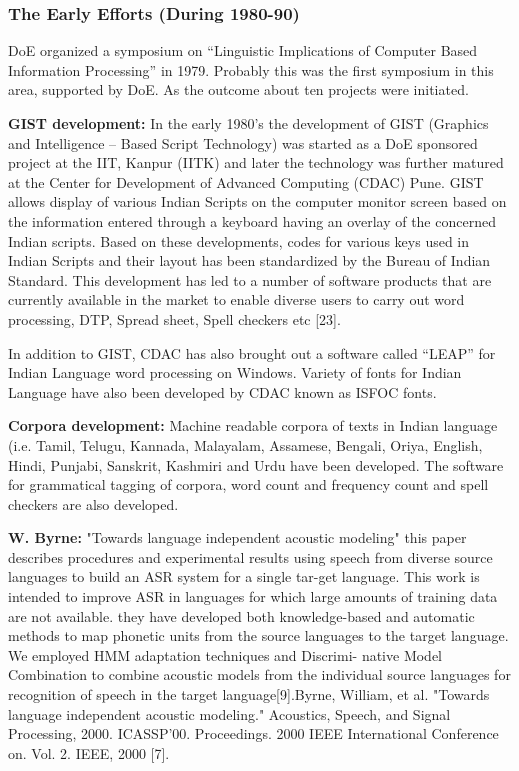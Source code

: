 \documentclass[12pt,a4paper,oneside]{memoir}
\begin{document}
\subsubsection{The Early Efforts (During 1980-90)}
DoE organized a symposium on “Linguistic Implications of Computer Based
Information Processing” in 1979. Probably this was the first symposium in this area,
supported by DoE. As the outcome about ten projects were initiated.

\textbf{GIST development:} In the early 1980’s the development of GIST (Graphics and
Intelligence – Based Script Technology) was started as a DoE sponsored project at the
IIT, Kanpur (IITK) and later the technology was further matured at the Center for
Development of Advanced Computing (CDAC) Pune. GIST allows display of various
Indian Scripts on the computer monitor screen based on the information entered
through a keyboard having an overlay of the concerned Indian scripts. Based on these
developments, codes for various keys used in Indian Scripts and their layout has been
standardized by the Bureau of Indian Standard. This development has led to a number
of software products that are currently available in the market to enable diverse users
to carry out word processing, DTP, Spread sheet, Spell checkers etc [23].

In addition to GIST, CDAC has also brought out a software called “LEAP” for Indian
Language word processing on Windows. Variety of fonts for Indian Language have
also been developed by CDAC known as ISFOC fonts.

\textbf{Corpora development:} Machine readable corpora of texts in Indian language
(i.e. Tamil, Telugu, Kannada, Malayalam, Assamese, Bengali, Oriya, English,
Hindi, Punjabi, Sanskrit, Kashmiri and Urdu have been developed.
The software for grammatical tagging of corpora, word count and frequency count
and spell checkers are also developed.

\textbf{W. Byrne:} "Towards language independent acoustic modeling" this paper describes procedures and experimental results using speech from
diverse source languages to build an ASR system for a single tar-get language. This work is intended to improve ASR in languages
for which large amounts of training data are not available. they have developed both knowledge-based and automatic methods to
map phonetic units from the source languages to the target language. We employed HMM adaptation techniques and Discrimi-
native Model Combination to combine acoustic models from the individual source languages for recognition of speech in the target language[9].Byrne, William, et al. "Towards language independent acoustic modeling." Acoustics, Speech, and Signal Processing, 2000. ICASSP'00. Proceedings. 2000 IEEE International Conference on. Vol. 2. IEEE, 2000 [7].
\end{document}
